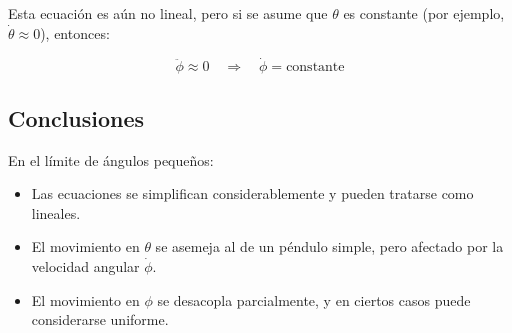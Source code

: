\documentclass[12pt]{article}
\begin{document}
Esta ecuación es aún no lineal, pero si se asume que \( \theta \) es constante (por ejemplo, \( \dot{\theta} \approx 0 \)), entonces:

\begin{equation}
\boxed{
\ddot{\phi} \approx 0 \quad \Rightarrow \quad \dot{\phi} = \text{constante}
}
\label{Eq13}
\end{equation}

\subsection*{Conclusiones}

En el límite de ángulos pequeños:

\begin{itemize}
    \item Las ecuaciones se simplifican considerablemente y pueden tratarse como lineales.
    \item El movimiento en \( \theta \) se asemeja al de un péndulo simple, pero afectado por la velocidad angular \( \dot{\phi} \).
    \item El movimiento en \( \phi \) se desacopla parcialmente, y en ciertos casos puede considerarse uniforme.
\end{itemize}
\end{document}
